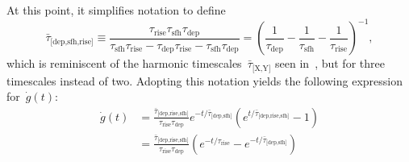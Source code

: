 \documentclass[12pt]{article}
\newcommand{\timescale}[1]{\ensuremath{\tau_\text{#1}}}
\newcommand{\harmonic}[2]{\ensuremath{\bar{\tau}_\text{[#1,#2]}}}
\begin{document}
At this point, it simplifies notation to define
\begin{equation}
\bar{\tau}_\text{[dep,sfh,rise]} \equiv \frac{
	\timescale{rise}\timescale{sfh}\timescale{dep}
}{
	\timescale{sfh}\timescale{rise} - \timescale{dep}\timescale{rise} -
	\timescale{sfh}\timescale{dep}
} = \left( \frac{1}{\timescale{dep}} - \frac{1}{\timescale{sfh}} -
\frac{1}{\timescale{rise}}\right)^{-1},
\end{equation}
which is reminiscent of the harmonic timescales~$\bar{\tau}_\text{[X,Y]}$ seen
in~\citet*{Weinberg2017}, but for three timescales instead of two.
Adopting this notation yields the following expression for~$\dot{g}(t)$:
\begin{equation}
\begin{split}
\dot{g}(t) &= \frac{
	\bar{\tau}_\text{[dep,rise,sfh]}
}{
	\timescale{rise}\timescale{dep}
} e^{-t / \bar{\tau}_\text{[dep,sfh]}} \left(e^{t /
\bar{\tau}_\text{[dep,rise,sfh]}} - 1\right)
\\
&= \frac{
	\bar{\tau}_\text{[dep,rise,sfh]}
}{
	\timescale{rise}\timescale{dep}
} \left(e^{-t / \timescale{rise}} - e^{-t / \harmonic{dep}{sfh}}\right)
\end{split}
\end{equation}
\end{document}
